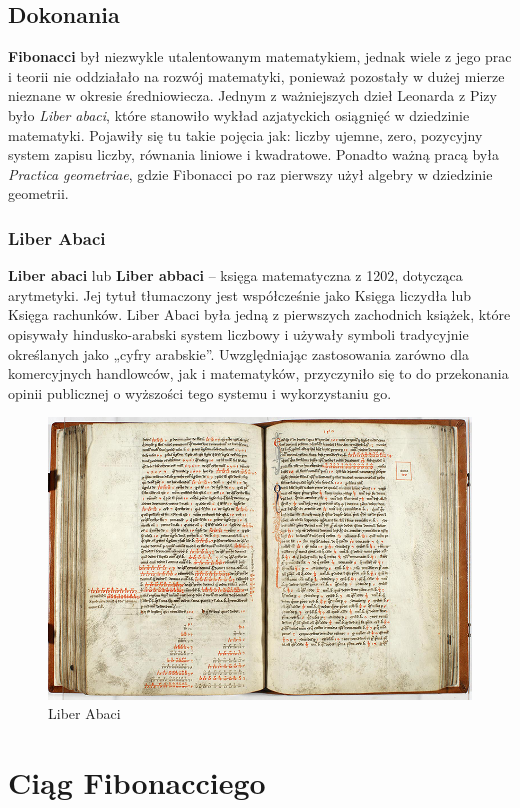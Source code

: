 \documentclass{report}
\begin{document}
\section{Dokonania}
\cite{fib3}
\textbf{Fibonacci} był niezwykle utalentowanym matematykiem, jednak wiele z jego prac i teorii nie oddziałało na rozwój matematyki, ponieważ pozostały w dużej mierze nieznane w okresie średniowiecza.
Jednym z ważniejszych dzieł Leonarda z Pizy było \textit{Liber abaci}, które stanowiło wykład azjatyckich osiągnięć w dziedzinie matematyki. Pojawiły się tu takie pojęcia jak: liczby ujemne, zero, pozycyjny system zapisu liczby, równania liniowe i kwadratowe.
Ponadto ważną pracą była \textit{Practica geometriae}, gdzie Fibonacci po raz pierwszy użył algebry w dziedzinie geometrii.
\subsection{Liber Abaci}
\cite{fib4}
\textbf{Liber abaci} lub \textbf{Liber abbaci} – księga matematyczna z 1202, dotycząca arytmetyki. Jej tytuł tłumaczony jest współcześnie jako Księga liczydła lub Księga rachunków. Liber Abaci była jedną z pierwszych zachodnich książek, które opisywały hindusko-arabski system liczbowy i używały symboli tradycyjnie określanych jako „cyfry arabskie”. Uwzględniając zastosowania zarówno dla komercyjnych handlowców, jak i matematyków, przyczyniło się to do przekonania opinii publicznej o wyższości tego systemu i wykorzystaniu go.
\begin{figure}[h]
\center
\includegraphics[scale=2]{liberabaci3}
\caption{Liber Abaci}
\end{figure}
\newpage
\chapter{Ciąg Fibonacciego}
\end{document}
